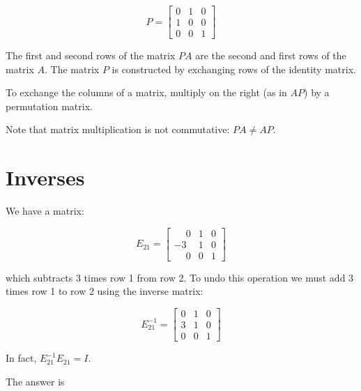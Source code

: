 \documentclass{ximera}
\begin{document}
\[
P=\begin{bmatrix} 0&1&0\\1&0&0\\0&0&1 \end{bmatrix}
\]

The first and second rows of the matrix $PA$ are the second and first rows of the 
matrix $A$. The matrix $P$ is constructed by exchanging rows of the identity matrix.

To exchange the columns of a matrix, multiply on the right (as in $AP$) by a 
permutation matrix.

Note that matrix multiplication is not commutative: $PA \neq AP$.

\section*{Inverses}

We have a matrix:

\[
 E_{21} = \begin{bmatrix} \phantom{-}0&1&0\\-3&1&0\\\phantom{-}0&0&1 \end{bmatrix}
\]

which subtracts 3 times row 1 from row 2. To undo this operation we must add 3 times 
row 1 to row 2 using the inverse matrix:

\[
 E_{21}^{-1} = \begin{bmatrix} 0&1&0\\3&1&0\\0&0&1 \end{bmatrix}
\]


In fact, $ E_{21}^{-1}E_{21} = I$.


\begin{question}
\begin{solution}
\begin{hint}
\end{hint}
The answer is 
\end{solution}
\end{question}
\end{document}
